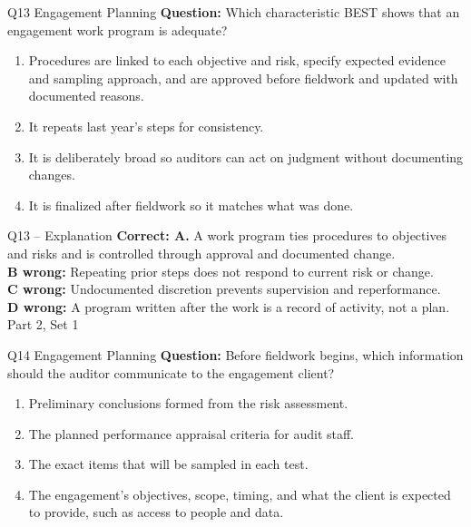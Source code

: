 \documentclass[aspectratio=169,10pt]{beamer}
\begin{document}
\begin{frame}[t]{Q13 \hfill {\scriptsize Engagement Planning}}
	\small
	\textbf{Question:} Which characteristic BEST shows that an engagement work program is adequate?
	\begin{enumerate}[label=\Alph*.,itemsep=1pt,topsep=3pt]
			\item Procedures are linked to each objective and risk, specify expected evidence and sampling approach, and are approved before fieldwork and updated with documented reasons.
			\item It repeats last year's steps for consistency.
			\item It is deliberately broad so auditors can act on judgment without documenting changes.
			\item It is finalized after fieldwork so it matches what was done.
	\end{enumerate}
\end{frame}
\begin{frame}[t]{Q13 -- Explanation}
	\footnotesize
	\textbf{Correct: A.} A work program ties procedures to objectives and risks and is controlled through approval and documented change. \\[5pt]
\textbf{B wrong:} Repeating prior steps does not respond to current risk or change. \\[3pt]
\textbf{C wrong:} Undocumented discretion prevents supervision and reperformance. \\[3pt]
\textbf{D wrong:} A program written after the work is a record of activity, not a plan. \\[3pt]
	\vfill {\tiny Part 2, Set 1}
\end{frame}
\begin{frame}[t]{Q14 \hfill {\scriptsize Engagement Planning}}
	\small
	\textbf{Question:} Before fieldwork begins, which information should the auditor communicate to the engagement client?
	\begin{enumerate}[label=\Alph*.,itemsep=1pt,topsep=3pt]
			\item Preliminary conclusions formed from the risk assessment.
			\item The planned performance appraisal criteria for audit staff.
			\item The exact items that will be sampled in each test.
			\item The engagement's objectives, scope, timing, and what the client is expected to provide, such as access to people and data.
	\end{enumerate}
\end{frame}
\end{document}
